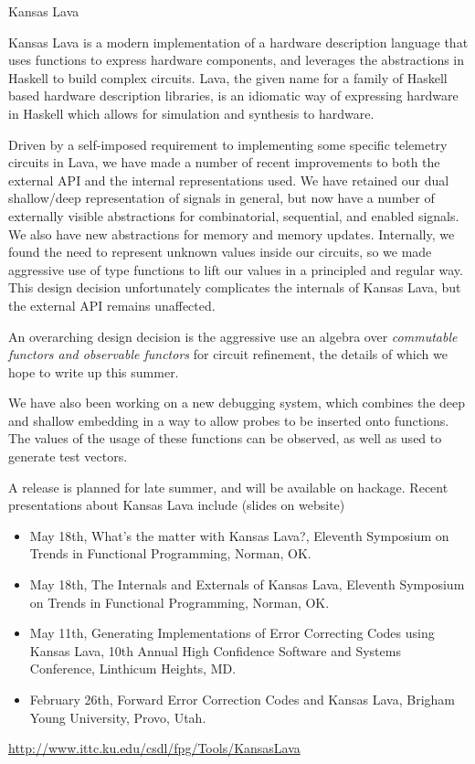 \documentclass{article}
\begin{document}
\begin{hcarentry}{Kansas Lava}
\makeheader

Kansas Lava is a modern implementation of a hardware description language
that uses functions to express hardware components,
and leverages the abstractions in Haskell to build complex circuits. 
Lava, 
the given name for a family of Haskell based hardware description libraries,
is an idiomatic way of expressing hardware in Haskell which allows for simulation and
synthesis to hardware.

Driven by a self-imposed requirement to implementing some specific telemetry circuits in Lava,
we have made a number of recent improvements to both the external API
and the internal representations used. 
We have retained our dual shallow/deep
representation of signals in general, but now have a number of externally visible
abstractions for combinatorial, sequential, and enabled signals.
We also have new abstractions for memory and memory updates.
Internally, we found the need to represent unknown values inside our circuits, 
so we made aggressive use of type functions to lift our values in a principled
and regular way. This design decision unfortunately 
complicates the internals of Kansas Lava, but the external
API remains unaffected.

An overarching design decision is the aggressive use an algebra over {\em commutable functors and observable functors\/} for circuit refinement, the details of which we hope to write up this summer.

We have also been working on a new debugging system, which combines the deep and 
shallow embedding in a way to allow probes to be inserted onto functions.
The values of the usage of these functions can be observed, as well 
as used to generate test vectors. 

A release is planned for late summer, and will be available on hackage. Recent presentations about Kansas Lava include (slides on website)
\begin{itemize}
\item May 18th, What's the matter with Kansas Lava?, Eleventh Symposium on Trends in Functional Programming, Norman, OK.
\item May 18th, The Internals and Externals of Kansas Lava, Eleventh Symposium on Trends in Functional Programming, Norman, OK.
\item May 11th, Generating Implementations of Error Correcting Codes using Kansas Lava, 10th Annual High Confidence  Software and Systems Conference, Linthicum Heights, MD.
\item February 26th, Forward Error Correction Codes and Kansas Lava, Brigham Young University, Provo, Utah.
\end{itemize}

\FurtherReading
  \url{http://www.ittc.ku.edu/csdl/fpg/Tools/KansasLava}


\end{hcarentry}
\end{document}
